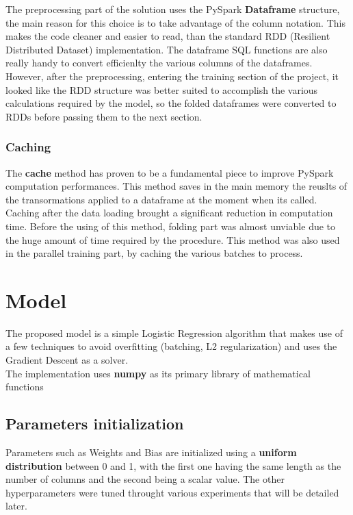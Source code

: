 \documentclass[
	letterpaper, %
	10pt, %
]{class}
\begin{document}
The preprocessing part of the solution uses the PySpark \textbf{Dataframe} structure, the main reason for this choice is to take advantage of the column notation. This makes the code cleaner and easier to read, than the standard RDD (Resilient Distributed Dataset) implementation. The dataframe SQL functions are also really handy to convert efficienlty the various columns of the dataframes.
However, after the preprocessing, entering the training section of the project, it looked like the RDD structure was better suited to accomplish the various calculations required by the model, so the folded dataframes were converted to RDDs before passing them to the next section.

\subsubsection{Caching}

The \textbf{cache} method has proven to be a fundamental piece to improve PySpark computation performances. This method saves in the main memory the reuslts of the transormations applied to a dataframe at the moment when its called. Caching after the data loading brought a significant reduction in computation time. Before the using of this method, folding part was almost unviable due to the huge amount of time required by the procedure.
This method was also used in the parallel training part, by caching the various batches to process.



\section{Model}

The proposed model is a simple Logistic Regression \cite{logistic} algorithm that makes use of a few techniques to avoid overfitting (batching, L2 regularization) and uses the Gradient Descent as a solver.\\
The implementation uses \textbf{numpy} \cite{numpy} as its primary library of mathematical functions

\subsection{Parameters initialization}
Parameters such as Weights and Bias are initialized using a \textbf{uniform distribution} between 0 and 1, with the first one having the same length as the number of columns and the second being a scalar value.
The other hyperparameters were tuned throught various experiments that will be detailed later.
\end{document}
